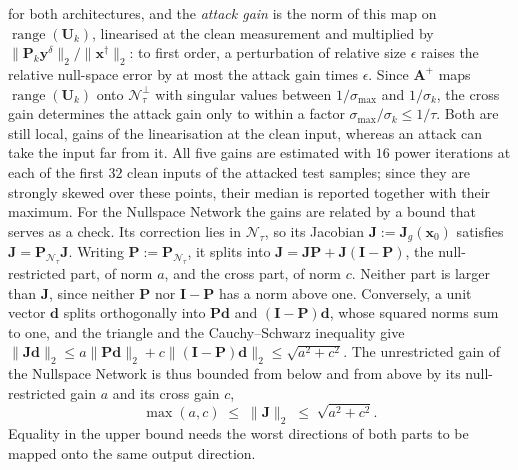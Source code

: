 \documentclass{article}
\numberwithin{equation}{section}
\begin{document}
for both architectures, and the \emph{attack gain} is the norm of this map on
$\operatorname{range}(\mathbf{U}_k)$, linearised at the clean measurement and multiplied by
$\lVert\mathbf{P}_k\mathbf{y}^\delta\rVert_2/\lVert\mathbf{x}^\dagger\rVert_2$: to first order, a perturbation
of relative size $\epsilon$ raises the relative null-space error by at most the attack gain times $\epsilon$.
Since $\mathbf{A}^{+}$ maps $\operatorname{range}(\mathbf{U}_k)$ onto $\mathcal{N}_\tau^\perp$ with singular
values between $1/\sigma_{\max}$ and $1/\sigma_k$, the cross gain determines the attack gain only to within a
factor $\sigma_{\max}/\sigma_k\leq1/\tau$. Both are still local, gains of the linearisation at the clean
input, whereas an attack can take the input far from it. All five gains are estimated with $16$ power
iterations at each of the first $32$ clean inputs of the attacked test samples; since they are strongly
skewed over these points, their median is reported together with their maximum.
For the Nullspace Network the gains are related by a bound that serves as a check. Its correction lies in
$\mathcal{N}_\tau$, so its Jacobian $\mathbf{J}:=\mathbf{J}_g(\mathbf{x}_0)$ satisfies
$\mathbf{J}=\mathbf{P}_{\mathcal{N}_\tau}\mathbf{J}$. Writing $\mathbf{P}:=\mathbf{P}_{\mathcal{N}_\tau}$, it
splits into $\mathbf{J}=\mathbf{J}\mathbf{P}+\mathbf{J}(\mathbf{I}-\mathbf{P})$, the null-restricted part, of
norm $a$, and the cross part, of norm $c$. Neither part is larger than $\mathbf{J}$, since neither
$\mathbf{P}$ nor $\mathbf{I}-\mathbf{P}$ has a norm above one. Conversely, a unit vector $\mathbf{d}$ splits
orthogonally into $\mathbf{P}\mathbf{d}$ and $(\mathbf{I}-\mathbf{P})\mathbf{d}$, whose squared norms sum to
one, and the triangle and the Cauchy--Schwarz inequality give
$\lVert\mathbf{J}\mathbf{d}\rVert_2\leq a\lVert\mathbf{P}\mathbf{d}\rVert_2+c\lVert(\mathbf{I}-\mathbf{P})\mathbf{d}\rVert_2\leq\sqrt{a^2+c^2}$.
The unrestricted gain of the Nullspace Network is thus bounded from below and from above by its
null-restricted gain $a$ and its cross gain $c$,
\begin{equation}\label{eq:split}
\max(a,c)\;\leq\;\lVert\mathbf{J}\rVert_2\;\leq\;\sqrt{a^2+c^2}.
\end{equation}
Equality in the upper bound needs the worst directions of both parts to be mapped onto the same output
direction.
\end{document}
